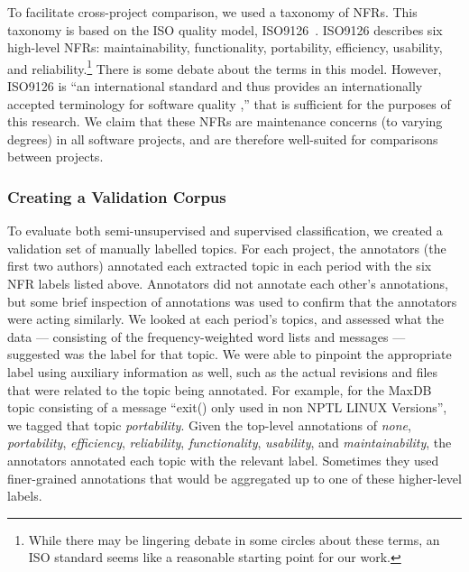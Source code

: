 \documentclass[smallextended]{svjour3}       %
\begin{document}

To facilitate cross-project comparison, we used a taxonomy of NFRs. This taxonomy is based on the ISO quality model, ISO9126~\cite{iso9126}. 
ISO9126 describes six high-level NFRs: maintainability, functionality,
portability, efficiency, usability, and reliability.\footnote{While there may be lingering debate in some circles about these terms, an ISO standard
seems like a reasonable starting point for our work.} 
There is some debate about the terms in this model. 
However, ISO9126 is ``an international standard and thus provides an 
internationally accepted terminology for software quality \cite[p. 58]{Boegh2008},'' that is sufficient for the purposes of this research.  
We claim that these NFRs are maintenance concerns (to varying degrees) in all software projects, and are therefore well-suited for comparisons between
projects.


\subsubsection{Creating a Validation Corpus}
To evaluate both semi-unsupervised and supervised classification, we
created a validation set of manually labelled topics. For each project,
 the annotators (the first two authors) annotated each extracted topic in each period with
the six NFR labels listed above.
Annotators did not annotate each other's annotations, but some brief
inspection of annotations was used to confirm that the annotators were
acting similarly.
We looked at each period's topics, and assessed what the data ---
consisting of the frequency-weighted word lists and messages ---
suggested was the label for that topic. 
We were able to pinpoint the appropriate label using auxiliary information as well, such as the actual revisions and files that were related to the
topic being annotated.
For example, for the MaxDB topic consisting of a message ``exit() only
used in non NPTL LINUX Versions'', we tagged that topic
\emph{portability}. 
Given the top-level annotations of \emph{none}, \emph{portability},
\emph{efficiency}, \emph{reliability}, \emph{functionality},
\emph{usability}, and \emph{maintainability}, the annotators annotated each topic
with the relevant label. Sometimes they used finer-grained
annotations that would be aggregated up to one of these higher-level labels.
\end{document}
